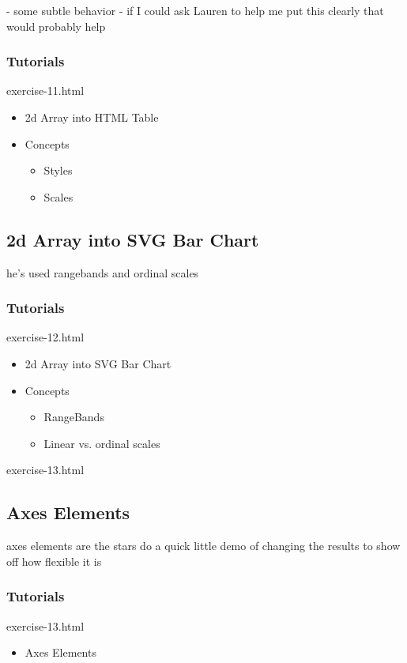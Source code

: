\documentclass{beamer}
\begin{document}
\begin{frame}
- some subtle behavior
- if I could ask Lauren to help me put this clearly that would probably help

\begin{frame}
    \frametitle{Tutorials}
    \begin{block}{exercise-11.html}
        \pause
        \begin{itemize}
        \pause
        \item 2d Array into HTML Table
        \pause
        \item Concepts
            \begin{itemize}
                \item Styles
                \item Scales
            \end{itemize}
        \end{itemize}
    \end{block}
\end{frame}


\subsection{2d Array into SVG Bar Chart}

he's used rangebands and ordinal scales


\begin{frame}
    \frametitle{Tutorials}
    \begin{block}{exercise-12.html}
        \pause
        \begin{itemize}
        \pause
        \item 2d Array into SVG Bar Chart
        \pause
        \item Concepts
            \begin{itemize}
                \item RangeBands
                \item Linear vs. ordinal scales
            \end{itemize}
        \end{itemize}
    \end{block}
\end{frame}


exercise-13.html
\subsection{Axes Elements}
axes elements are the stars
do a quick little demo of changing the results to show off how flexible it is
\begin{frame}
    \frametitle{Tutorials}
    \begin{block}{exercise-13.html}
        \begin{itemize}
            \pause
            \item Axes Elements
        \end{itemize} 
    \end{block}
\end{frame}



\end{frame}
\end{document}
